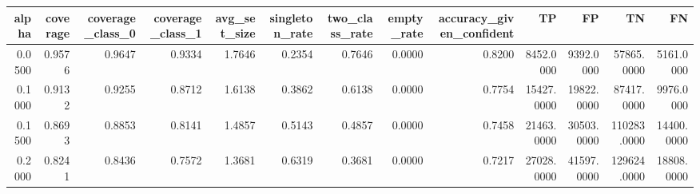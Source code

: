 \begin{tabular}{rrrrrrrrrrrrr}
\toprule
alpha & coverage & coverage_class_0 & coverage_class_1 & avg_set_size & singleton_rate & two_class_rate & empty_rate & accuracy_given_confident & TP & FP & TN & FN \\
\midrule
0.0500 & 0.9576 & 0.9647 & 0.9334 & 1.7646 & 0.2354 & 0.7646 & 0.0000 & 0.8200 & 8452.0000 & 9392.0000 & 57865.0000 & 5161.0000 \\
0.1000 & 0.9132 & 0.9255 & 0.8712 & 1.6138 & 0.3862 & 0.6138 & 0.0000 & 0.7754 & 15427.0000 & 19822.0000 & 87417.0000 & 9976.0000 \\
0.1500 & 0.8693 & 0.8853 & 0.8141 & 1.4857 & 0.5143 & 0.4857 & 0.0000 & 0.7458 & 21463.0000 & 30503.0000 & 110283.0000 & 14400.0000 \\
0.2000 & 0.8241 & 0.8436 & 0.7572 & 1.3681 & 0.6319 & 0.3681 & 0.0000 & 0.7217 & 27028.0000 & 41597.0000 & 129624.0000 & 18808.0000 \\
\bottomrule
\end{tabular}
